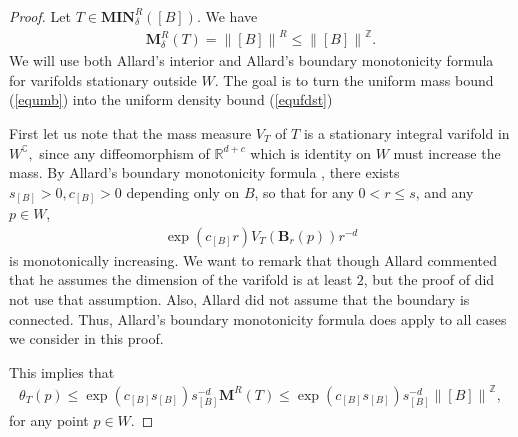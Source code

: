 \documentclass[11pt,a4paper]{amsart}
\numberwithin{equation}{section}
\newcommand{\mn}{\mathbf{MIN}}
\newcommand{\de}{\delta}
\newcommand{\ta}{\theta}
\newcommand{\ms}{\mathbf{M}}
\newcommand{\cp}{^\complement}
\newcommand{\no}[1]{\left\lVert#1\right\rVert}
\newcommand{\R}{\mathbb{R}}
\newcommand{\Z}{\mathbb{Z}}
\theoremstyle{plain}
\theoremstyle{definition}
\numberwithin{equation}{subsection}
\begin{document}
\begin{proof}
	Let $T\in\mn^R_\de([B]).$ We have
	\begin{align}\label{equmb}
		\ms^R_\de(T)=\no{[B]}^R\le\no{[B]}^{\Z}.
	\end{align} We will use both Allard's interior and Allard's boundary monotonicity formula for varifolds stationary outside $W$. The goal is to turn the uniform mass bound (\ref{equmb}) into the uniform density bound (\ref{equfdst})
	
First let us note that the mass measure $V_T$ of $T$ is a stationary integral varifold in $W\cp,$ since any diffeomorphism of $\R^{d+c}$ which is identity on $W$ must increase the mass. By Allard's boundary monotonicity formula \cite[(2) Theorem of Section 3.4]{WAb}, there exists $s_{[B]}>0,c_{[B]}>0$ depending only on $B$, so that for any $0<r\le s$, and any $p\in W$,
	\begin{align}\label{bdmon}
		\exp(c_{[B]}r)V_T(\mathbf{B}_r(p))r^{-d}
	\end{align}
	is monotonically increasing. We want to remark that though Allard commented \cite[Section 3.3]{WAb} that he assumes the dimension of the varifold is at least $2$, but the proof of \cite[(2) Theorem of Section 3.4]{WAb} did not use that assumption. Also, Allard did not assume that the boundary is connected. Thus, Allard's boundary monotonicity formula does apply to all cases we consider in this proof.	
	
	This implies that 
	\begin{align}\label{monpb}
		\ta_T(p)\le \exp(c_{[B]}s_{[B]})s_{[B]}^{-d}\ms^R(T)\le\exp(c_{[B]}s_{[B]})s_{[B]}^{-d}\no{[B]}^{\Z},
	\end{align}
	for any point $p\in  W.$ 
	
	
	

\end{proof}
\end{document}
